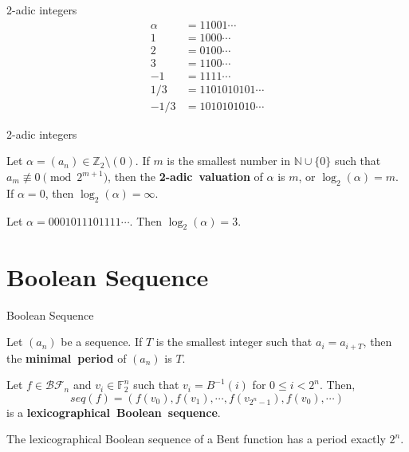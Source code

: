 \documentclass{beamer}
\def\zzz{\mathbb{Z}}
\def\gftwo{\mathbb{F}_2}
\def\nnn{\mathbb{N}}
\def\BF{\mathcal{BF}}
\def\an{(a_n)}
\begin{document}
\begin{frame}{2-adic integers}
  \begin{align*}
    \alpha&=11001\cdots\\
    1&=1000\cdots\\
    2&=0100\cdots\\
    3&=1100\cdots\\
    -1&=1111\cdots\\
    1/3&=1101010101\cdots\\
    -1/3&=1010101010\cdots
  \end{align*}
\end{frame}

\begin{frame}{2-adic integers}
  \begin{definition}
    Let $\alpha=\an\in\zzz_2\setminus(0)$. If $m$ is the smallest number in
    $\nnn\cup\{0\}$ such that $a_m \not\equiv 0 \pmod 2^{m+1}$, then the {\bf
    2-adic\ valuation} of $\alpha$ is $m$, or $\log_2(\alpha)=m$. If $\alpha=0$,
    then $\log_2(\alpha)=\infty$.
  \end{definition}
  \begin{example}
    Let $\alpha=0001011101111\cdots$. Then $\log_2(\alpha)=3$.
  \end{example}
\end{frame}

\section{Boolean Sequence}
\begin{frame}{Boolean Sequence}
  \pause
  \begin{definition}
    Let $(a_n)$ be a sequence. If $T$ is the smallest integer such that
    $a_i=a_{i+T}$, then the {\bf minimal\ period} of $(a_n)$ is $T$.
  \end{definition}
  
  \begin{definition}\label{def:lex-Bool-seq}
    Let $f\in\BF_n$ and $v_i\in\gftwo^n$ such that $v_i=B^{-1}(i)$ for
    $0\leq i<2^n$. Then,
    \begin{equation}
      seq(f)=(f(v_0),f(v_1),\cdots,f(v_{2^n-1}),f(v_0),\cdots)
    \end{equation}
    is a {\bf lexicographical\ Boolean\ sequence}.
  \end{definition}
  \begin{theorem}
    The lexicographical Boolean sequence of a Bent function has a period
    exactly $2^n$.
  \end{theorem}
\end{frame}
\end{document}
